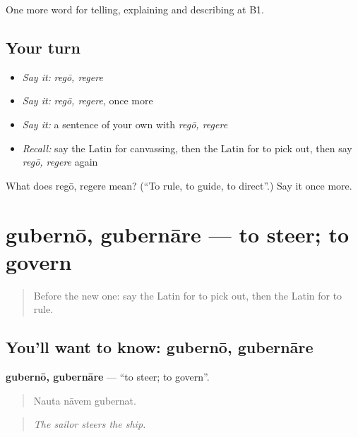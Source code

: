\begin{grammarlens}[title={What you've built}]
One more word for telling, explaining and describing at B1.
\end{grammarlens}

\subsection*{Your turn}
\begin{itemize}
\raggedright
  \item \emph{Say it:} \emph{regō, regere}
  \item \emph{Say it:} \emph{regō, regere}, once more
  \item \emph{Say it:} a sentence of your own with \emph{regō, regere}
  \item \emph{Recall:} say the Latin for canvassing, then the Latin for to pick out, then say \emph{regō, regere} again
\end{itemize}

\begin{tcolorbox}[breakable,colback=teal!4,colframe=teal!35!black,title={Before you move on}]
What does regō, regere mean? (\textquotedblleft{}To rule, to guide, to direct\textquotedblright{}.) Say it once more.
\end{tcolorbox}
\section[gubernō, gubernāre]{gubernō, gubernāre — to steer; to govern}

\label{lesson:LA-C385-guberno}



\begin{quote}
Before the new one: say the Latin for to pick out, then the Latin for to rule.
\end{quote}

\subsection*{You'll want to know: gubernō, gubernāre}
\textbf{gubernō, gubernāre} — \textquotedblleft{}to steer; to govern\textquotedblright{}.

\begin{quote}
Nauta nāvem gubernat.
\end{quote}

\begin{quote}
\emph{The sailor steers the ship.}
\end{quote}

